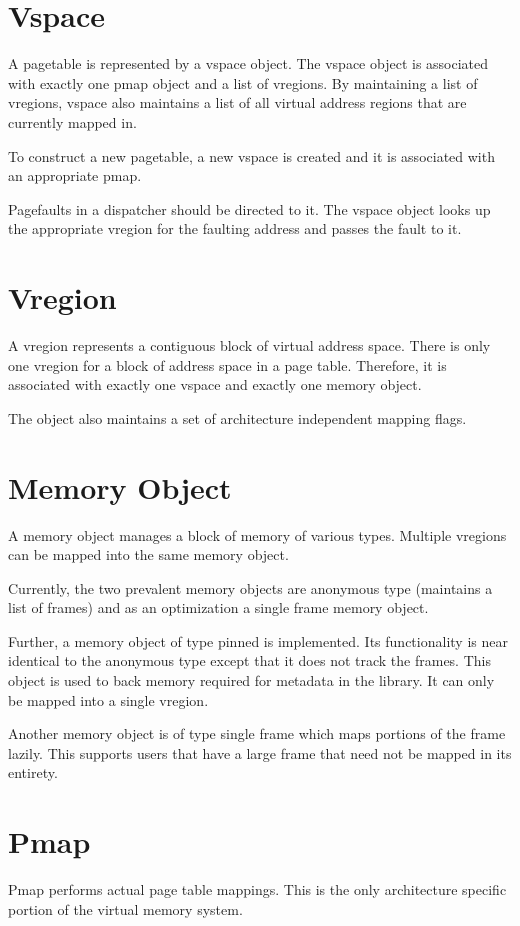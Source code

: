 \documentclass[a4paper,twoside]{report} %
\begin{document}
\section{Vspace}
A pagetable is represented by a vspace object.
The vspace object is associated with exactly one pmap object and a list of vregions.
By maintaining a list of vregions,
vspace also maintains a list of all virtual address regions that are currently mapped in.

To construct a new pagetable,
a new vspace is created and it is associated with an appropriate pmap.

Pagefaults in a dispatcher should be directed to it.
The vspace object looks up the appropriate vregion for the faulting address and passes the fault to it.

\section{Vregion}
A vregion represents a contiguous block of virtual address space.
There is only one vregion for a block of address space in a page table.
Therefore, it is associated with exactly one vspace and exactly one memory object.

The object also maintains a set of architecture independent mapping flags.

\section{Memory Object}
A memory object manages a block of memory of various types.
Multiple vregions can be mapped into the same memory object.

Currently, the two prevalent memory objects are anonymous type (maintains a list of frames)
and as an optimization a single frame memory object.

Further, a memory object of type pinned is implemented.
Its functionality is near identical to the anonymous type
except that it does not track the frames.
This object is used to back memory required for metadata in the library.
It can only be mapped into a single vregion.

Another memory object is of type single frame which maps portions of the frame lazily.
This supports users that have a large frame that need not be mapped in its entirety.

\section{Pmap}
Pmap performs actual page table mappings.
This is the only architecture specific portion of the virtual memory system.
\end{document}
